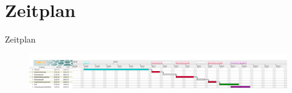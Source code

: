 \documentclass[18pt]{beamer}
\begin{document}
\section{Zeitplan}
\begin{frame}{Zeitplan}
    \begin{figure}
      \centering
      \includegraphics[width=\textwidth]{./images/document.png}
    \end{figure}
\end{frame}

\appendix
\beginbackup


\backupend
\end{document}
